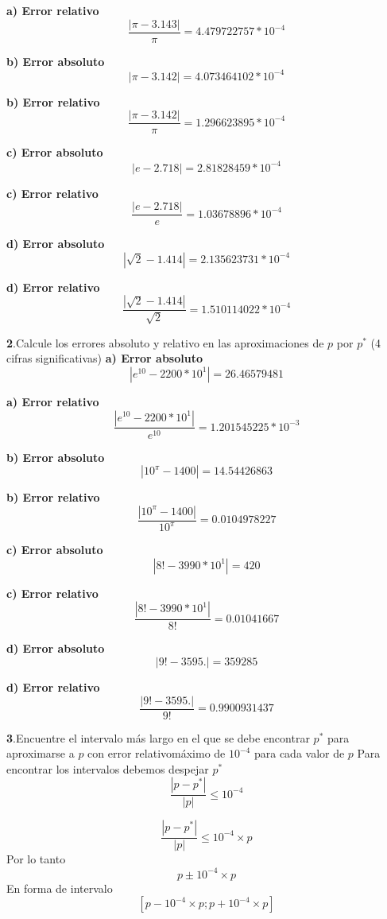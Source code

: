\documentclass[12pt]{article}
\begin{document}
\textbf{a) Error relativo}
$$\frac{\left|\pi - 3.143 \right|}{\pi} = 4.479722757*10^{-4}$$

\textbf{b) Error absoluto}
$$\left| \pi - 3.142 \right| = 4.073464102*10^{-4}$$

\textbf{b) Error relativo}
$$\frac{\left|\pi - 3.142 \right|}{\pi} = 1.296623895*10^{-4}$$

\textbf{c) Error absoluto}
$$\left| e - 2.718 \right| = 2.81828459*10^{-4}$$

\textbf{c) Error relativo}
$$\frac{\left|e - 2.718 \right|}{e} = 1.03678896*10^{-4}$$

\textbf{d) Error absoluto}
$$\left| \sqrt{2} - 1.414 \right| = 2.135623731*10^{-4}$$

\textbf{d) Error relativo}
$$\frac{\left|\sqrt{2} - 1.414  \right|}{\sqrt{2}} = 1.510114022*10^{-4}$$

\textbf{2}.Calcule los errores absoluto y relativo en las aproximaciones de $p$ por $p^{*}$ (4 cifras significativas)
\newline\textbf{a) Error absoluto}
$$\left| e^{10} - 2200*10^1 \right| = 26.46579481$$

\textbf{a) Error relativo}
$$\frac{\left|e^{10} - 2200*10^1 \right|}{e^{10}} = 1.201545225*10^{-3}$$

\textbf{b) Error absoluto}
$$\left|10^{\pi} - 1400 \right| = 14.54426863$$

\textbf{b) Error relativo}
$$\frac{\left|10^{\pi} - 1400 \right|}{10^{\pi}} = 0.0104978227$$

\textbf{c) Error absoluto}
$$\left| 8! - 3990*10^1 \right| = 420$$

\textbf{c) Error relativo}
$$\frac{\left|8! - 3990*10^1 \right|}{8!} = 0.01041667$$

\textbf{d) Error absoluto}
$$\left| 9! - 3595. \right| = 359285$$

\textbf{d) Error relativo}
$$\frac{\left|9! - 3595.\right|}{9!} = 0.9900931437$$

\textbf{3}.Encuentre el intervalo más largo en el que se debe encontrar $p^{*}$  para aproximarse a $p$ con error relativomáximo de $10^{-4}$ para cada valor de $p$
\newline\newline  Para encontrar los intervalos debemos despejar $p^{*}$
$$
\frac{ \left| p - p^{*} \right| }{\left| p \right|} \leq 10^{-4}
$$

$$
\frac{ \left| p - p^{*} \right| }{\left| p \right|}\leq 10^{-4}\times p
$$
Por lo tanto
$$
p \pm 10^{-4}\times p
$$
En forma de intervalo
$$
[p - 10^{-4}\times p ; p + 10^{-4}\times p]
$$
\end{document}
